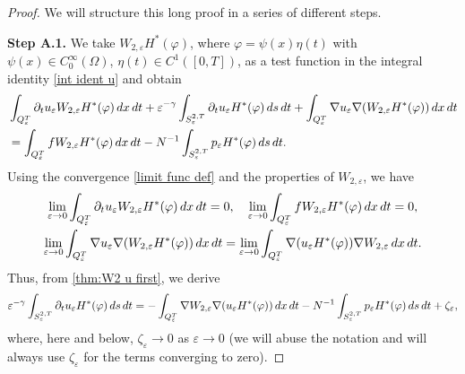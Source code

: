 \documentclass[reqno]{amsart}
\begin{document}
\begin{proof}
We will structure this long proof in a series of different steps.
\smallskip 

\noindent\textbf{Step A.1.}
 We take $W_{2,\varepsilon }H^{\ast }(\varphi )$, where 
$\varphi =\psi (x)\eta (t)$ with $\psi (x)\in C_0^{\infty }(\Omega )$, 
$\eta (t)\in C^{1}([0,T])$, as a test function in the integral identity 
\eqref{int ident u} and obtain
\begin{equation}
\begin{aligned}
&\int _{Q_{\varepsilon }^{T}}\partial _{t}u_{\varepsilon
}W_{2,\varepsilon }H^{\ast }(\varphi )\,dx\,dt+\varepsilon ^{-\gamma }\int
_{S_{\varepsilon }^{2,T}}\partial _{t}u_{\varepsilon }H^{\ast
}(\varphi )\,ds\,dt+\int _{Q_{\varepsilon }^{T}}\nabla u_{\varepsilon
}\nabla (W_{2,\varepsilon }H^{\ast }(\varphi ))\,dx\,dt    \\
&=\int _{Q_{\varepsilon }^{T}}fW_{2,\varepsilon }H^{\ast }(\varphi ){%
\,dx\,dt}-N^{-1}\int _{S_{\varepsilon }^{2,T}}p_{\varepsilon }H^{\ast
}(\varphi )\,ds\,dt.
\end{aligned} \label{thm:W2 u first}
\end{equation}
Using the convergence \eqref{limit func def} and the properties of $W_{2,\varepsilon }$, 
we have
\begin{gather*}
\lim _{\varepsilon \to 0}\int _{Q_{\varepsilon
}^{T}}\partial _{t}u_{\varepsilon }W_{2,\varepsilon }H^{\ast }(\varphi ){\,dx\,dt%
}=0,\quad \lim _{\varepsilon \to 0}\int
_{Q_{\varepsilon }^{T}}fW_{2,\varepsilon }H^{\ast }(\varphi )\,dx\,dt=0,
\\
\lim _{\varepsilon \to 0}\int _{Q_{\varepsilon
}^{T}}\nabla u_{\varepsilon }\nabla (W_{2,\varepsilon }H^{\ast }(\varphi )){%
\,dx\,dt}=\lim _{\varepsilon \to 0}\int _{Q_{\varepsilon
}^{T}}\nabla (u_{\varepsilon }H^{\ast }(\varphi ))\nabla W_{2,\varepsilon }{%
\,dx\,dt}.
\end{gather*}
Thus, from \eqref{thm:W2 u first}, we derive
\[
\varepsilon ^{-\gamma }\int _{S_{\varepsilon }^{2,T}}\partial
_{t}u_{\varepsilon }H^{\ast }(\varphi )\,ds\,dt=-\int _{Q_{\varepsilon
}^{T}}\nabla W_{2,\varepsilon }\nabla (u_{\varepsilon }H^{\ast }(\varphi )){%
\,dx\,dt}-N^{-1}\int _{S_{\varepsilon }^{2,T}}p_{\varepsilon }H^{\ast
}(\varphi )\,ds\,dt+\zeta _{\varepsilon },
\]
where, here and below, $\zeta _{\varepsilon }\to 0$ as $\varepsilon
\to 0$ (we will abuse the notation and will always use $\zeta
_{\varepsilon }$ for the terms converging to zero).


\end{proof}
\end{document}
